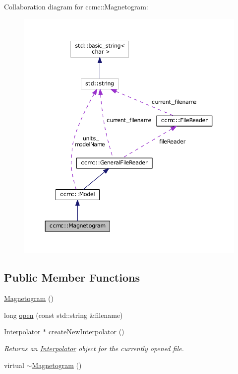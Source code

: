 Collaboration diagram for ccmc\-:\-:Magnetogram\-:\nopagebreak
\begin{figure}[H]
\begin{center}
\leavevmode
\includegraphics[width=350pt]{classccmc_1_1_magnetogram__coll__graph}
\end{center}
\end{figure}
\subsection*{Public Member Functions}
\begin{DoxyCompactItemize}
\item 
\hyperlink{classccmc_1_1_magnetogram_af35bd68bafd421803fa79807b9c641f3}{Magnetogram} ()
\item 
long \hyperlink{classccmc_1_1_magnetogram_af940dde096c046974a46bf4c12f300fa}{open} (const std\-::string \&filename)
\item 
\hyperlink{classccmc_1_1_interpolator}{Interpolator} $\ast$ \hyperlink{classccmc_1_1_magnetogram_aebea202039a3bf9d21236402db7261f6}{create\-New\-Interpolator} ()
\begin{DoxyCompactList}\small\item\em Returns an \hyperlink{classccmc_1_1_interpolator}{Interpolator} object for the currently opened file.  \end{DoxyCompactList}\item 
virtual \hyperlink{classccmc_1_1_magnetogram_afeec893d32919b028608874a8c2d26e3}{$\sim$\-Magnetogram} ()
\end{DoxyCompactItemize}

